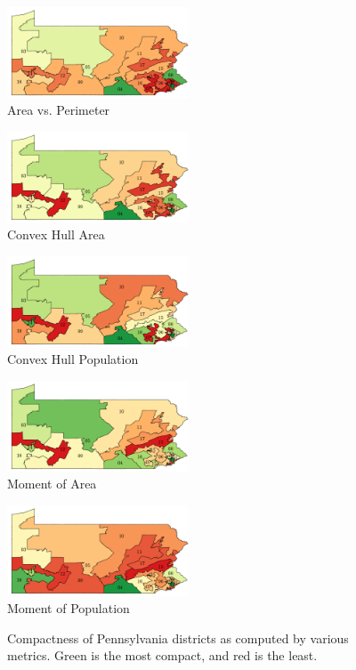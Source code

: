 \documentclass[12pt]{article}
\begin{document}
  \begin{figure}
    \begin{center}
      \parbox{0.49\textwidth}{\centering \includegraphics[width=0.48\textwidth]{map-area_per.pdf} \\ Area vs. Perimeter}
      \parbox{0.49\textwidth}{\centering \includegraphics[width=0.48\textwidth]{map-convex_hull.pdf} \\ Convex Hull Area}
      \parbox{0.49\textwidth}{\centering \includegraphics[width=0.48\textwidth]{map-convex_hull_pop.pdf} \\ Convex Hull Population}
      \parbox{0.49\textwidth}{\centering \includegraphics[width=0.48\textwidth]{map-moment_area.pdf} \\ Moment of Area}
      \parbox{0.49\textwidth}{\centering \includegraphics[width=0.48\textwidth]{map-moment_pop.pdf} \\ Moment of Population}
      \parbox{0.49\textwidth}{\centering \parbox{0.4\textwidth}{\caption{Compactness of Pennsylvania districts as computed by various metrics.  Green is the most compact, and red is the least.\label{f:compactnessmaps}}}}
    \end{center}
  \end{figure}
\end{document}
